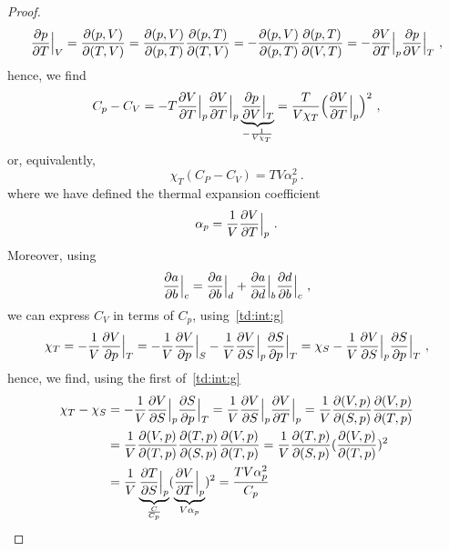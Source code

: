 \begin{proof}
\begin{equation*}
            \frac{\partial p}{\partial T} \Big \vert_V = \frac{\partial(p, V)}{\partial(T, V)} = \frac{\partial(p,V)}{\partial(p, T)} \frac{\partial(p, T)}{\partial(T, V)} = - \frac{\partial(p,V)}{\partial(p, T)} \frac{\partial(p, T)}{\partial(V, T)} = - \frac{\partial V}{\partial T} \Big \vert_p \frac{\partial p}{\partial V} \Big \vert_T ~,
        \end{equation*}
        hence, we find
        \begin{equation*}
            C_p - C_V = - T \frac{\partial V}{\partial T} \Big \vert_p \frac{\partial V}{\partial T} \Big \vert_p \underbrace{\frac{\partial p}{\partial V} \Big \vert_T}_{- \frac{1}{V \chi_T}} = \frac{T}{V \chi_T} \Big ( \frac{\partial V}{\partial T} \Big \vert_p \Big)^2 ~,
        \end{equation*}
        or, equivalently,
        \begin{equation*}
            \chi_T (C_P - C_V) = T V \alpha_p^2 ~.
        \end{equation*}
        where we have defined the thermal expansion coefficient
         \begin{equation}
            \alpha_p = \frac{1}{V} \frac{\partial V}{\partial T} \Big \vert_p ~.
        \end{equation}
        Moreover, using
        \begin{equation*}
            \frac{\partial a}{\partial b} \Big \vert_c = \frac{\partial a}{\partial b} \Big \vert_d + \frac{\partial a}{\partial d} \Big \vert_b \frac{\partial d}{\partial b} \Big \vert_c ~,
        \end{equation*}
        we can express $C_V$ in terms of $C_p$, using~\eqref{td:int:g} 
        \begin{equation*}
            \chi_T = - \frac{1}{V} \frac{\partial V}{\partial p} \Big \vert_T = - \frac{1}{V} \frac{\partial V}{\partial p} \Big \vert_S - \frac{1}{V} \frac{\partial V}{\partial S} \Big \vert_p \frac{\partial S}{\partial p} \Big \vert_T = \chi_S - \frac{1}{V} \frac{\partial V}{\partial S} \Big \vert_p \frac{\partial S}{\partial p} \Big \vert_T ~,
        \end{equation*}
        hence, we find, using the first of~\eqref{td:int:g}
        \begin{equation*}
        \begin{aligned}
            \chi_T - \chi_S & = - \frac{1}{V} \pdv{V}{S} \Big \vert_p \pdv{S}{p} \Big \vert_T = \frac{1}{V} \pdv{V}{S} \Big \vert_p \pdv{V}{T} \Big \vert_p  = \frac{1}{V} \pdv{(V, p)}{(S, p)} \pdv{(V, p)}{(T, p)}\\ &  = \frac{1}{V} \pdv{(V, p)}{(T, p)} \pdv{(T, p)}{(S, p)} \pdv{(V, p)}{(T, p)} = \frac{1}{V} \pdv{(T, p)}{(S, p)} (\pdv{(V, p)}{(T, p)})^2 \\ & = \frac{1}{V} \underbrace{\pdv{T}{S} \Big \vert_p}_{\frac{C}{C_p}} (\underbrace{\pdv{V}{T} \Big \vert_p}_{V \alpha_p})^2 = \frac{T V \alpha_p^2}{C_p} 
        \end{aligned}

\end{equation*}
\end{proof}
